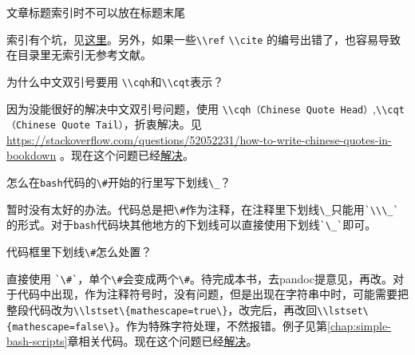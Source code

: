 \documentclass[doctor,openright,twoside]{sjtuthesis}
\newcommand{\passthrough}[1]{#1}
\theoremstyle{plain}
\theoremstyle{definition}
\theoremstyle{remark}
\theoremstyle{ocrenumbox}
\theoremstyle{plain}
\let\BeginKnitrBlock\begin \let\EndKnitrBlock\end
\begin{document}
\BeginKnitrBlock{question}
文章标题索引时不可以放在标题末尾
\EndKnitrBlock{question}

\BeginKnitrBlock{answer}
索引有个坑，见\href{https://github.com/jgm/pandoc/issues/4762}{这里}。另外，如果一些\passthrough{\lstinline!\\ref!} \passthrough{\lstinline!\\cite!} 的编号出错了，也容易导致在目录里无索引无参考文献。
\EndKnitrBlock{answer}

\BeginKnitrBlock{question}
为什么中文双引号要用 \passthrough{\lstinline!\\cqh!}和\passthrough{\lstinline!\\cqt!}表示？
\EndKnitrBlock{question}

\BeginKnitrBlock{answer}
因为没能很好的解决中文双引号问题，使用 \passthrough{\lstinline!\\cqh（Chinese Quote Head）!},\passthrough{\lstinline!\\cqt（Chinese Quote Tail）!}，折衷解决。见 \url{https://stackoverflow.com/questions/52052231/how-to-write-chinese-quotes-in-bookdown} 。现在这个问题已经\href{https://github.com/rstudio/bookdown/issues/687}{解决}。
\EndKnitrBlock{answer}

\BeginKnitrBlock{question}
怎么在\passthrough{\lstinline!bash!}代码的\passthrough{\lstinline!\#!}开始的行里写下划线\passthrough{\lstinline!\_!}？
\EndKnitrBlock{question}

\BeginKnitrBlock{answer}
暂时没有太好的办法。代码总是把\passthrough{\lstinline!\#!}作为注释，在注释里下划线\passthrough{\lstinline!\_!}只能用\passthrough{\lstinline!`\\\_`!} 的形式。对于\passthrough{\lstinline!bash!}代码块其他地方的下划线可以直接使用下划线\passthrough{\lstinline!`\_`!}即可。
\EndKnitrBlock{answer}

\BeginKnitrBlock{question}
代码框里下划线\passthrough{\lstinline!\#!}怎么处置？
\EndKnitrBlock{question}

\BeginKnitrBlock{answer}
直接使用 \passthrough{\lstinline!`\#`!}，单个\passthrough{\lstinline!\#!}会变成两个\passthrough{\lstinline!\#!}。待完成本书，去pandoc提意见，再改。对于代码中出现，作为注释符号时，没有问题，但是出现在字符串中时，可能需要把整段代码改为\passthrough{\lstinline!\\lstset\{mathescape=true\}!}，改完后，再改回\passthrough{\lstinline!\\lstset\{mathescape=false\}!}。作为特殊字符处理，不然报错。例子见第\ref{chap:simple-bash-scripts}章相关代码。现在这个问题已经\href{https://github.com/jgm/pandoc/issues/4922}{解决}。
\EndKnitrBlock{answer}
\end{document}

